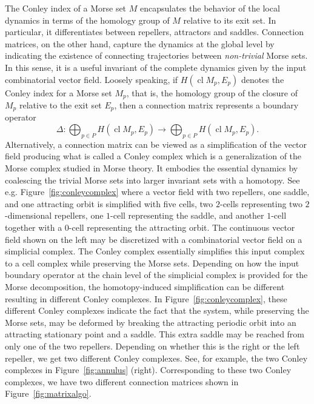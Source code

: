 \documentclass[a4paper,english,cleveref]{article}
\theoremstyle{plain}
\newcommand{\cl}{\operatorname{cl}}
\newcounter{li}
\begin{document}
{The Conley index of a Morse set $M$ encapsulates the behavior of 
the local dynamics in terms of the homology
group of $M$ relative to its exit set. 
In particular, it differentiates between repellers, attractors and saddles.
Connection matrices, on the other hand, capture the dynamics 
at the global level by indicating the existence of connecting trajectories between \emph{non-trivial} Morse sets. 
In this sense, it is a useful
invariant of the complete dynamics given by the input combinatorial vector field. 
Loosely speaking,
if $H(\cl{M_p}, E_p)$ denotes the Conley index for a Morse set $M_p$, that is, the homology group of the closure of $M_p$ relative to
the exit set $E_p$, then a
connection matrix represents a boundary operator
\begin{equation*}
\Delta: \bigoplus_{p\in P} H(\cl M_p,E_p)\rightarrow \bigoplus_{p\in P} H(\cl M_p,E_p).
\end{equation*}
Alternatively,
a connection matrix can be viewed as a simplification of the vector field producing what is called a Conley complex which is a generalization of the Morse complex studied in Morse theory.
It embodies the essential dynamics by coalescing the trivial Morse sets into larger invariant
sets with a homotopy. See e.g. Figure~\ref{fig:conleycomplex} where
a vector field with two repellers, one saddle, and one attracting orbit
is simplified with five cells, two $2$-cells representing two $2$-dimensional repellers,
one $1$-cell representing the saddle, and another $1$-cell together with
a $0$-cell representing the attracting orbit. The continuous vector field shown on the left
may be discretized with a combinatorial vector field on a simplicial complex. The Conley complex
essentially simplifies this input complex to a cell complex while preserving the
Morse sets.
Depending on how the input boundary operator at the chain level of the simplicial complex
is provided for the Morse decomposition,
the homotopy-induced simplification can be different resulting in different Conley complexes.
In Figure~\ref{fig:conleycomplex}, these different Conley complexes 
indicate the fact that the system, while preserving the Morse sets, 
may be deformed by breaking the attracting periodic orbit into an attracting stationary point and a saddle. This extra saddle may be reached from only one of the two repellers. Depending on whether this is the right or the left repeller, we get two different Conley complexes.
See, for example, the two Conley complexes in Figure~\ref{fig:annulus} (right).
Corresponding to these two Conley complexes, we have two different connection matrices
shown in Figure~\ref{fig:matrixalgo}.
}
\end{document}
